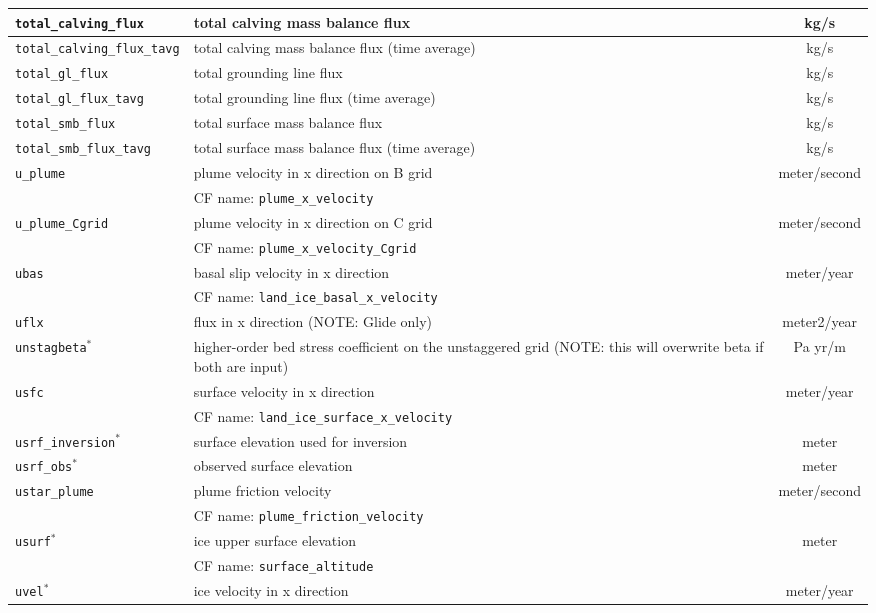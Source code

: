 \begin{center}
\begin{supertabular}{|l|p{8cm}|c|}
\hline
\texttt{total\_calving\_flux} & total calving mass balance flux & kg/s\\
\hline
\texttt{total\_calving\_flux\_tavg} & total calving mass balance flux (time average) & kg/s\\
\hline
\texttt{total\_gl\_flux} & total grounding line flux & kg/s\\
\hline
\texttt{total\_gl\_flux\_tavg} & total grounding line flux (time average) & kg/s\\
\hline
\texttt{total\_smb\_flux} & total surface mass balance flux & kg/s\\
\hline
\texttt{total\_smb\_flux\_tavg} & total surface mass balance flux (time average) & kg/s\\
\hline
\texttt{u\_plume} & plume velocity in x direction on B grid & meter/second\\
&CF name: \texttt{plume\_x\_velocity}&\\
\hline
\texttt{u\_plume\_Cgrid} & plume velocity in x direction on C grid & meter/second\\
&CF name: \texttt{plume\_x\_velocity\_Cgrid}&\\
\hline
\texttt{ubas} & basal slip velocity in x direction & meter/year\\
&CF name: \texttt{land\_ice\_basal\_x\_velocity}&\\
\hline
\texttt{uflx} & flux in x direction (NOTE: Glide only) & meter2/year\\
\hline
\texttt{unstagbeta}$^\ast$ & higher-order bed stress coefficient on the unstaggered grid (NOTE: this will overwrite beta if both are input) & Pa yr/m\\
\hline
\texttt{usfc} & surface velocity in x direction & meter/year\\
&CF name: \texttt{land\_ice\_surface\_x\_velocity}&\\
\hline
\texttt{usrf\_inversion}$^\ast$ & surface elevation used for inversion & meter\\
\hline
\texttt{usrf\_obs}$^\ast$ & observed surface elevation & meter\\
\hline
\texttt{ustar\_plume} & plume friction velocity & meter/second\\
&CF name: \texttt{plume\_friction\_velocity}&\\
\hline
\texttt{usurf}$^\ast$ & ice upper surface elevation & meter\\
&CF name: \texttt{surface\_altitude}&\\
\hline
\texttt{uvel}$^\ast$ & ice velocity in x direction & meter/year\\

\end{supertabular}
\end{center}
